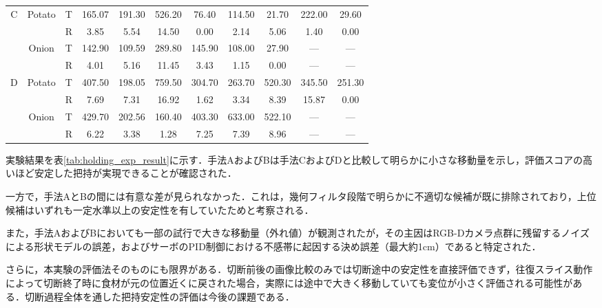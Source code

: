 \begin{table}[H]
\begin{tabular}{ccccccccccc}
\multirow{4}{*}{C} & \multirow{2}{*}{Potato} & \multicolumn{1}{c|}{T} & 165.07 & \multicolumn{1}{c|}{191.30} & 526.20 & 76.40  & 114.50 & 21.70  & 222.00 & 29.60  \\
                   &                         & \multicolumn{1}{c|}{R} & 3.85   & \multicolumn{1}{c|}{5.54}   & 14.50  & 0.00   & 2.14   & 5.06   & 1.40   & 0.00   \\ \cline{2-11} 
                   & \multirow{2}{*}{Onion}  & \multicolumn{1}{c|}{T} & 142.90 & \multicolumn{1}{c|}{109.59} & 289.80 & 145.90 & 108.00 & 27.90  & ---    & ---    \\
                   &                         & \multicolumn{1}{c|}{R} & 4.01   & \multicolumn{1}{c|}{5.16}   & 11.45  & 3.43   & 1.15   & 0.00   & ---    & ---    \\ \hline\hline
\multirow{4}{*}{D} & \multirow{2}{*}{Potato} & \multicolumn{1}{c|}{T} & 407.50 & \multicolumn{1}{c|}{198.05} & 759.50 & 304.70 & 263.70 & 520.30 & 345.50 & 251.30 \\
                   &                         & \multicolumn{1}{c|}{R} & 7.69   & \multicolumn{1}{c|}{7.31}   & 16.92  & 1.62   & 3.34   & 8.39   & 15.87  & 0.00   \\ \cline{2-11} 
                   & \multirow{2}{*}{Onion}  & \multicolumn{1}{c|}{T} & 429.70 & \multicolumn{1}{c|}{202.56} & 160.40 & 403.30 & 633.00 & 522.10 & ---    & ---    \\
                   &                         & \multicolumn{1}{c|}{R} & 6.22   & \multicolumn{1}{c|}{3.38}   & 1.28   & 7.25   & 7.39   & 8.96   & ---    & ---    \\ \hline
\end{tabular}
\end{table}

実験結果を表\ref{tab:holding_exp_result}に示す．手法AおよびBは手法CおよびDと比較して明らかに小さな移動量を示し，評価スコアの高い{\nameholdingpointset}ほど安定した把持が実現できることが確認された．

一方で，手法AとBの間には有意な差が見られなかった．これは，幾何フィルタ段階で明らかに不適切な候補が既に排除されており，上位候補はいずれも一定水準以上の安定性を有していたためと考察される．

また，手法AおよびBにおいても一部の試行で大きな移動量（外れ値）が観測されたが，その主因はRGB-Dカメラ点群に残留するノイズによる形状モデルの誤差，およびサーボのPID制御における不感帯に起因する{\namefingerpoint}決め誤差（最大約1cm）であると特定された．

さらに，本実験の評価法そのものにも限界がある．切断前後の画像比較のみでは切断途中の安定性を直接評価できず，往復スライス動作によって切断終了時に食材が元の位置近くに戻された場合，実際には途中で大きく移動していても変位が小さく評価される可能性がある．切断過程全体を通した把持安定性の評価は今後の課題である．


